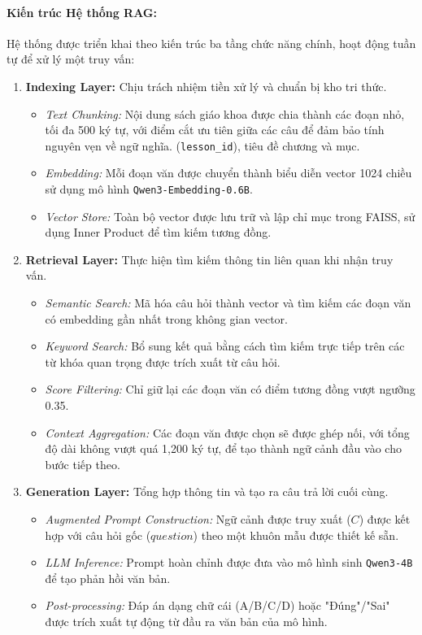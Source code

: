 \paragraph{Kiến trúc Hệ thống RAG:}
Hệ thống được triển khai theo kiến trúc ba tầng chức năng chính, hoạt động tuần tự để xử lý một truy vấn:

\begin{enumerate}
    \item \textbf{Indexing Layer:} Chịu trách nhiệm tiền xử lý và chuẩn bị kho tri thức.
    \begin{itemize}
        \item \textit{Text Chunking:} Nội dung sách giáo khoa được chia thành các đoạn nhỏ, tối đa 500 ký tự, với điểm cắt ưu tiên giữa các câu để đảm bảo tính nguyên vẹn về ngữ nghĩa.
        (\texttt{lesson\_id}), tiêu đề chương và mục.
        \item \textit{Embedding:} Mỗi đoạn văn được chuyển thành biểu diễn vector 1024 chiều sử dụng mô hình \texttt{Qwen3-Embedding-0.6B}.
        \item \textit{Vector Store:} Toàn bộ vector được lưu trữ và lập chỉ mục trong FAISS, sử dụng Inner Product để tìm kiếm tương đồng.
    \end{itemize}

    \item \textbf{Retrieval Layer:} Thực hiện tìm kiếm thông tin liên quan khi nhận truy vấn.
    \begin{itemize}
        \item \textit{Semantic Search:} Mã hóa câu hỏi thành vector và tìm kiếm các đoạn văn có embedding gần nhất trong không gian vector.
        \item \textit{Keyword Search:} Bổ sung kết quả bằng cách tìm kiếm trực tiếp trên các từ khóa quan trọng được trích xuất từ câu hỏi.
        \item \textit{Score Filtering:} Chỉ giữ lại các đoạn văn có điểm tương đồng vượt ngưỡng 0.35.
        \item \textit{Context Aggregation:} Các đoạn văn được chọn sẽ được ghép nối, với tổng độ dài không vượt quá 1,200 ký tự, để tạo thành ngữ cảnh đầu vào cho bước tiếp theo.
    \end{itemize}

    \item \textbf{Generation Layer:} Tổng hợp thông tin và tạo ra câu trả lời cuối cùng.
    \begin{itemize}
        \item \textit{Augmented Prompt Construction:} Ngữ cảnh được truy xuất ($C$) được kết hợp với câu hỏi gốc ($question$) theo một khuôn mẫu được thiết kế sẵn.
        \item \textit{LLM Inference:} Prompt hoàn chỉnh được đưa vào mô hình sinh \texttt{Qwen3-4B} để tạo phản hồi văn bản.
        \item \textit{Post-processing:} Đáp án dạng chữ cái (A/B/C/D) hoặc "Đúng"/"Sai" được trích xuất tự động từ đầu ra văn bản của mô hình.
    \end{itemize}
\end{enumerate}

